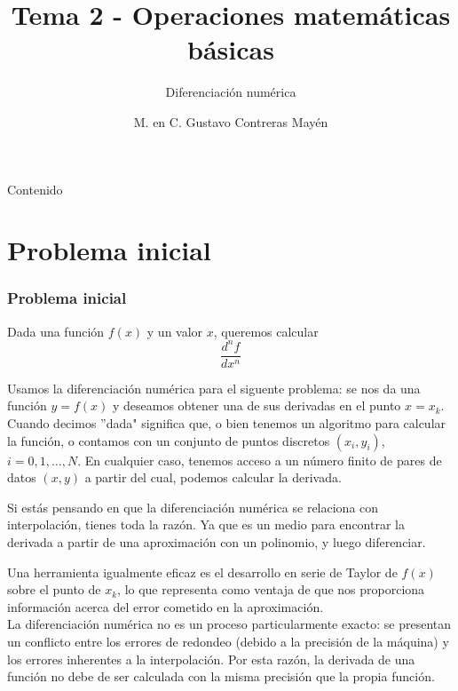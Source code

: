 


\title{Tema 2 - Operaciones matemáticas básicas}
\subtitle{Diferenciación numérica}
\author[]{M. en C. Gustavo Contreras Mayén}
\maketitle
\fontsize{14}{14}\selectfont
{}
\begin{frame}{Contenido}
\tableofcontents[pausesections]
\end{frame}
\section{Problema inicial}
\begin{frame}
\frametitle{Problema inicial}
Dada una función $f(x)$ y un valor $x$, queremos calcular
\[\dfrac{d^{n}f}{dx^{n}} \]
\end{frame}
\begin{frame}
Usamos la diferenciación numérica para el siguente problema: se nos da una función $y=f(x)$ y deseamos obtener una de sus derivadas en el punto $x=x_{k}$.
\\
\bigskip
Cuando decimos ''dada" significa que, o bien tenemos un algoritmo para calcular la función, o contamos con un conjunto de puntos discretos $(x_{i}, y_{i})$, $i = 0, 1,\ldots,N$. En cualquier caso, tenemos acceso a un número finito de pares de datos $(x, y)$ a partir del cual, podemos calcular la derivada.
\end{frame}
\begin{frame}
Si estás pensando en que la diferenciación numérica se relaciona con interpolación, tienes toda la razón. Ya que es un medio para encontrar la derivada a partir de una aproximación con un polinomio, y luego diferenciar.
\end{frame}
\begin{frame}
Una herramienta igualmente eficaz es el desarrollo en serie de Taylor de $f(x)$ sobre el punto de $x_{k}$, lo que representa como ventaja de que nos proporciona información acerca del error cometido en la aproximación.
\\
\bigskip
La diferenciación numérica no es un proceso particularmente exacto: se presentan un conflicto entre los errores de redondeo (debido a la precisión de la máquina) y los errores inherentes a la interpolación. Por esta razón, la derivada de una función no debe de ser calculada con la misma precisión que la propia función.
\end{frame}
